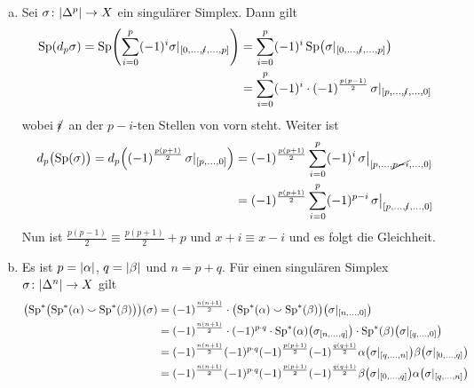 \begin{beweis}
	\begin{enumerate}[a)]
		\item Sei $\sigma \colon \abs{\Delta^p} \to X$ ein singulärer Simplex. Dann gilt
		\begin{align}
			\Sp(d_p \sigma) = \Sp\enbrace*{\sum_{i=0}^{p} (-1)^i \sigma|_{\benbrace*{0, \ldots , \slashedi, \ldots ,p}}} 
			&= \sum_{i=0}^{p} (-1)^i \Sp \enbrace*{\sigma|_{\benbrace*{0, \ldots , \slashedi, \ldots , p}}} \\
			&= \sum_{i=0}^{p} (-1)^i \cdot (-1)^{\frac{p(p-1)}{2}} \,\sigma|_{\benbrace*{p, \ldots , \slashedi, \ldots , 0}}
		\end{align}
		wobei $\slashedi$ an der $p-i$-ten Stellen von vorn steht. Weiter ist
		\begin{align}
			d_p \enbrace[\big]{\Sp(\sigma)} = d_p \enbrace*{(-1)^{\frac{p(p+1)}{2}} \,\sigma|_{\benbrace*{p, \ldots ,0}}} &= (-1)^{\frac{p(p+1)}{2}} \sum_{i=0}^{p} (-1)^i\, 
			\sigma\big|_{\benbrace*{p, \ldots , \cancel{p-i}, \ldots ,0}} \\ 
			&= (-1)^{\frac{p(p+1)}{2}} \sum_{i=0}^{p} (-1)^{p-i} \,\sigma\big|_{\benbrace*{p, \ldots ,\slashedi, \ldots ,0}}
		\end{align}
		Nun ist $\frac{p(p-1)}{2} \equiv \frac{p(p+1)}{2} + p$ und $x +i \equiv x-i$ und es folgt die Gleichheit.
		\item Es ist $p=\abs*{\alpha}$, $q=\abs*{\beta}$ und $n=p+q$.
		Für einen singulären Simplex $\sigma \colon \abs{\Delta^n} \to X$ gilt 
		\begin{align}
			\enbrace*{\Sp^* \enbrace[\big]{\Sp^*(\alpha) \cupp \Sp^*(\beta)}}(\sigma) &= (-1)^{\frac{n(n+1)}{2}} \cdot \enbrace[\big]{\Sp^*(\alpha) \cupp \Sp^*(\beta)} 
			\enbrace*{\sigma|_{\benbrace*{n, \ldots ,0}}} \\
			&= (-1)^{\frac{n(n+1)}{2}} \cdot (-1)^{p \cdot q}\cdot \Sp^*(\alpha) \enbrace*{\sigma_{\benbrace*{n, \ldots , q}}} \cdot \Sp^*(\beta) 
			\enbrace*{\sigma|_{\benbrace*{q, \ldots ,0}}} \\
			&= (-1)^{\frac{n(n+1)}{2}} (-1)^{p \cdot q} (-1)^{\frac{p(p+1)}{2}} (-1)^{\frac{q(q+1)}{2}} \alpha \enbrace*{\sigma|_{\benbrace*{q, \ldots ,n}}}
			\beta \enbrace*{\sigma|_{\benbrace{0, \ldots ,q}}} \\
			&= (-1)^{\frac{n(n+1)}{2}} (-1)^{p \cdot q} (-1)^{\frac{p(p+1)}{2}} (-1)^{\frac{q(q+1)}{2}} \beta \enbrace*{\sigma|_{\benbrace{0, \ldots ,q}}} 
			\alpha \enbrace*{\sigma|_{\benbrace*{q, \ldots ,n}}} \\

\end{align}
\end{enumerate}
\end{beweis}
